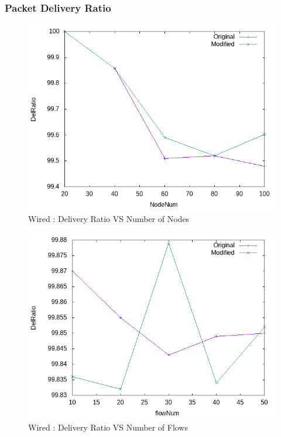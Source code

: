 \subsubsection{Packet Delivery Ratio}
    \begin{figure}[!h]
        \centering
        \includegraphics[width=.9\textwidth]{Pictures/Wired/Combined/DelRatioVSNodeNum.png}
        \caption{Wired : Delivery Ratio VS Number of Nodes}
    \end{figure}
    
     \begin{figure}[!h]
        \centering
        \includegraphics[width=.9\textwidth]{Pictures/Wired/Combined/DelRatioVSflowNum.png}
        \caption{Wired : Delivery Ratio VS Number of Flows}
    \end{figure}
    
